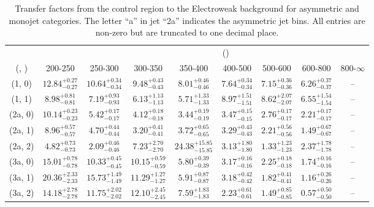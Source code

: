 \begin{table}[h!]
\tiny
\centering
\caption{Transfer factors from the \mmj control region to the Electroweak background for asymmetric and monojet categories. The letter ``a'' in jet \eg ``2a''  indicates the asymmetric jet bins. All entries are non-zero but are truncated to one decimal place.\label{tab:tf_mumu_total_asym}}
\begin{tabular}
{ccccccccc}
	\hline\hline
&	& \multicolumn{8}{c}{\scalht (\gev)} \\ 
	 (\njet,  \nb) & 200-250 & 250-300 & 300-350 & 350-400 & 400-500 & 500-600 & 600-800 & 800-$\infty$ \\ [0.8ex] 
\hline
	(1, 0) & $12.84^{+ 0.27 }_{- 0.27 }$ & $10.64^{+ 0.34 }_{- 0.34 }$ & $9.48^{+ 0.43 }_{- 0.43 }$ & $8.01^{+ 0.46 }_{- 0.46 }$ & $7.64^{+ 0.34 }_{- 0.34 }$ & $7.15^{+ 0.36 }_{- 0.36 }$ & $6.26^{+ 0.37 }_{- 0.37 }$ & -- \\[0.5ex] 
	(1, 1) & $8.98^{+ 0.81 }_{- 0.81 }$ & $7.19^{+ 0.93 }_{- 0.93 }$ & $6.13^{+ 1.13 }_{- 1.13 }$ & $5.71^{+ 1.33 }_{- 1.33 }$ & $8.97^{+ 1.51 }_{- 1.51 }$ & $8.62^{+ 2.07 }_{- 2.07 }$ & $6.55^{+ 1.54 }_{- 1.54 }$ & -- \\[0.5ex] 
	(2a, 0) & $10.14^{+ 0.23 }_{- 0.23 }$ & $5.42^{+ 0.17 }_{- 0.17 }$ & $4.12^{+ 0.18 }_{- 0.18 }$ & $3.44^{+ 0.19 }_{- 0.19 }$ & $3.47^{+ 0.15 }_{- 0.15 }$ & $2.76^{+ 0.17 }_{- 0.17 }$ & $2.21^{+ 0.17 }_{- 0.17 }$ & -- \\[0.5ex] 
	(2a, 1) & $8.96^{+ 0.57 }_{- 0.57 }$ & $4.70^{+ 0.44 }_{- 0.44 }$ & $3.20^{+ 0.41 }_{- 0.41 }$ & $3.72^{+ 0.65 }_{- 0.65 }$ & $3.29^{+ 0.43 }_{- 0.43 }$ & $2.21^{+ 0.56 }_{- 0.56 }$ & $1.49^{+ 0.67 }_{- 0.67 }$ & -- \\[0.5ex] 
	(2a, 2) & $4.82^{+ 0.73 }_{- 0.73 }$ & $2.09^{+ 0.46 }_{- 0.46 }$ & $7.23^{+ 2.70 }_{- 2.70 }$ & $24.38^{+ 15.85 }_{- 15.85 }$ & $3.13^{+ 1.80 }_{- 1.80 }$ & $1.33^{+ 1.23 }_{- 1.23 }$ & $2.37^{+ 1.78 }_{- 1.78 }$ & -- \\[0.5ex] 
	(3a, 0) & $15.01^{+ 0.78 }_{- 0.78 }$ & $10.33^{+ 0.45 }_{- 0.45 }$ & $10.15^{+ 0.59 }_{- 0.59 }$ & $5.80^{+ 0.39 }_{- 0.39 }$ & $3.17^{+ 0.16 }_{- 0.16 }$ & $2.25^{+ 0.18 }_{- 0.18 }$ & $1.74^{+ 0.16 }_{- 0.16 }$ & -- \\[0.5ex] 
	(3a, 1) & $20.36^{+ 2.33 }_{- 2.33 }$ & $15.73^{+ 1.49 }_{- 1.49 }$ & $11.29^{+ 1.27 }_{- 1.27 }$ & $5.91^{+ 0.87 }_{- 0.87 }$ & $3.18^{+ 0.42 }_{- 0.42 }$ & $1.82^{+ 0.41 }_{- 0.41 }$ & $1.16^{+ 0.26 }_{- 0.26 }$ & -- \\[0.5ex] 
	(3a, 2) & $14.18^{+ 2.78 }_{- 2.78 }$ & $11.75^{+ 2.02 }_{- 2.02 }$ & $12.10^{+ 2.45 }_{- 2.45 }$ & $7.59^{+ 1.83 }_{- 1.83 }$ & $2.23^{+ 0.61 }_{- 0.61 }$ & $1.49^{+ 0.85 }_{- 0.85 }$ & $0.57^{+ 0.50 }_{- 0.50 }$ & -- \\[0.5ex] 

\end{tabular}
\end{table}
